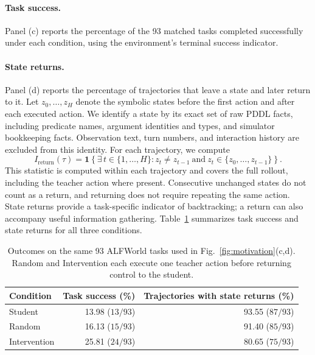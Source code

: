 \paragraph{Task success.}
Panel (c) reports the percentage of the 93 matched tasks completed successfully
under each condition, using the environment's terminal success indicator.

\paragraph{State returns.}
Panel (d) reports the percentage of trajectories that leave a state and later
return to it. Let $z_0,\ldots,z_H$ denote the symbolic states before the first
action and after each executed action. We identify a state by its exact set of
raw PDDL facts, including predicate names, argument identities and types, and
simulator bookkeeping facts. Observation text, turn numbers, and interaction
history are excluded from this identity. For each trajectory, we compute
\[
I_{\mathrm{return}}(\tau)
=\mathbf{1}\!\left\{\exists\,t\in\{1,\ldots,H\}:
 z_t\ne z_{t-1}\ \text{and}\ z_t\in\{z_0,\ldots,z_{t-1}\}\right\}.
\]
This statistic is computed within each trajectory and covers the full rollout,
including the teacher action where present. Consecutive unchanged states do not
count as a return, and returning does not require repeating the same action.
State returns provide a task-specific indicator of backtracking; a return can
also accompany useful information gathering.
Table~\ref{tab:motivation_protocol} summarizes task success and state returns for all three conditions.

\begin{table}[ht]
\centering
\small
\begin{tabular}{lrr}
\toprule
Condition & Task success (\%) & Trajectories with state returns (\%) \\
\midrule
Student      & 13.98 ($13/93$) & 93.55 ($87/93$) \\
Random       & 16.13 ($15/93$) & 91.40 ($85/93$) \\
Intervention & 25.81 ($24/93$) & 80.65 ($75/93$) \\
\bottomrule
\end{tabular}
\caption{Outcomes on the same 93 ALFWorld tasks used in
Fig.~\ref{fig:motivation}(c,d). Random and Intervention each execute one teacher
action before returning control to the student.}
\label{tab:motivation_protocol}
\end{table}


